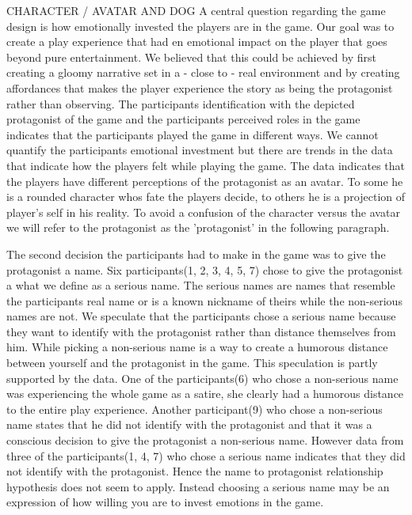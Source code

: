 CHARACTER / AVATAR AND DOG
A central question regarding the game design is how emotionally invested the players are in the game. Our goal was to create a play experience that had en emotional impact on the player that goes beyond pure entertainment. We believed that this could be achieved by first creating a gloomy narrative set in a - close to - real environment and by creating affordances that makes the player experience the story as being the protagonist rather than observing.  The participants identification with the depicted protagonist of the game and the participants perceived roles in the game indicates that the participants played the game in different ways. We cannot quantify the participants emotional investment but there are trends in the data that indicate how the players felt while playing the game. The data indicates that the players have different perceptions of the protagonist as an avatar. To some he is a rounded character whos fate the players decide, to others he is a projection of player's self in his reality. To avoid a confusion of the character versus the avatar we will refer to the protagonist as the 'protagonist' in the following paragraph.

The second decision the participants had to make in the game was to give the protagonist a name. Six participants(1, 2, 3, 4, 5, 7) chose to give the protagonist a what we define as a serious name. The serious names are names that resemble the participants real name or is a known nickname of theirs while the non-serious names are not. We speculate that the participants chose a serious name because they want to identify with the protagonist rather than distance themselves from him. While picking a non-serious name is a way to create a humorous distance between yourself and the protagonist in the game. This speculation is partly supported by the data. One of the participants(6) who chose a non-serious name was experiencing the whole game as a satire, she clearly had a humorous distance to the entire play experience. Another participant(9) who chose a non-serious name states that he did not identify with the protagonist and that it was a conscious decision to give the protagonist a non-serious name. However data from three of the participants(1, 4, 7) who chose a serious name indicates that they did not identify with the protagonist. Hence the name to protagonist relationship hypothesis does not seem to apply. Instead choosing a serious name may be an expression of how willing you are to invest emotions in the game.

